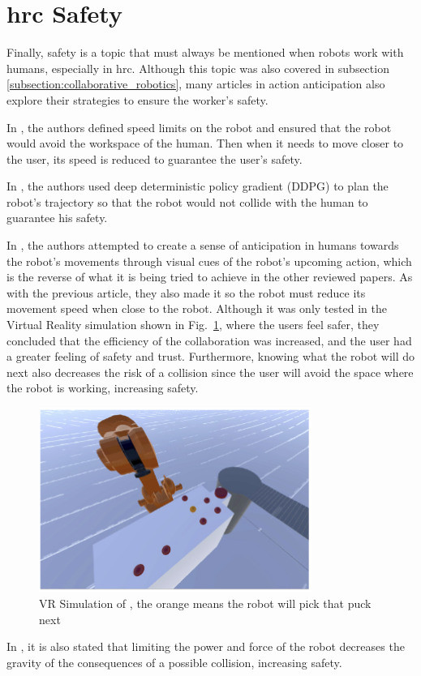 \section{\acl{hrc} Safety}

Finally, safety is a topic that must always be mentioned when robots work with humans, especially in \acs{hrc}. Although this topic was also covered in subsection \ref{subsection:collaborative_robotics}, many articles in action anticipation also explore their strategies to ensure the worker's safety.

In \cite{Zhang2022}, the authors defined speed limits on the robot and ensured that the robot would avoid the workspace of the human. Then when it needs to move closer to the user, its speed is reduced to guarantee the user's safety.

In \cite{Wu2023}, the authors used deep deterministic policy gradient (DDPG) to plan the robot's trajectory so that the robot would not collide with the human to guarantee his safety.

In \cite{Psarakis2022}, the authors attempted to create a sense of anticipation in humans towards the robot's movements through visual cues of the robot's upcoming action, which is the reverse of what it is being tried to achieve in the other reviewed papers. As with the previous article, they also made it so the robot must reduce its movement speed when close to the robot. Although it was only tested in the Virtual Reality simulation shown in Fig.~\ref{vr}, where the users feel safer, they concluded that the efficiency of the collaboration was increased, and the user had a greater feeling of safety and trust. Furthermore, knowing what the robot will do next also decreases the risk of a collision since the user will avoid the space where the robot is working, increasing safety.

\begin{figure}[H]
\centerline{\includegraphics[width=3.5in]{figs/reverse.PNG}}
\caption{VR Simulation of \cite{Psarakis2022}, the orange means the robot will pick that puck next}
\label{vr}
\end{figure}

In \cite{Mukherjee2022}, it is also stated that limiting the power and force of the robot decreases the gravity of the consequences of a possible collision, increasing safety.